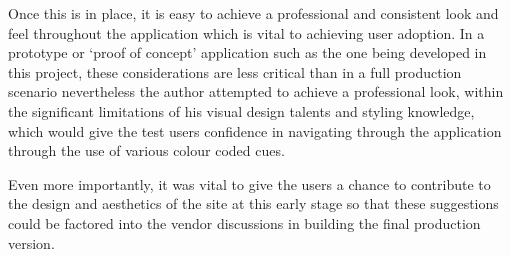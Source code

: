 \documentclass[a4paper,Times New Roman 11pt]{article}
\begin{document}
Once this is in place,  it is easy to achieve a professional and consistent look and feel throughout the application which is vital to achieving user adoption. In a prototype or `proof of concept' application such as the one being developed in this project, these considerations are less critical than in a full  production scenario nevertheless the author attempted to achieve a professional look, within the significant limitations of his visual design talents and styling knowledge, which would give the test users confidence in navigating through the application through the use of various colour coded cues.

Even more importantly, it was vital to give the users a chance to contribute to the design and aesthetics of the site at this early stage so that these suggestions could be factored into the vendor discussions in building the final production version. 
\end{document}
